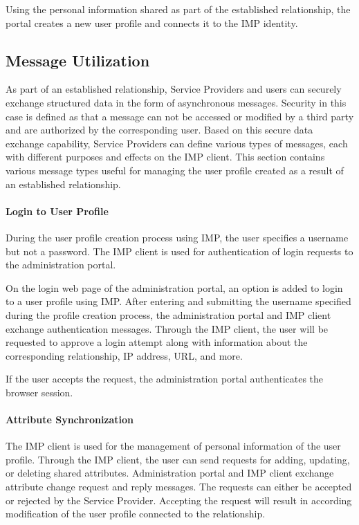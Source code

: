 Using the personal information shared as part of the established relationship, the portal creates a new user profile and connects it to the IMP identity.

\subsection{Message Utilization}
As part of an established relationship, Service Providers and users can securely exchange structured data in the form of asynchronous messages. Security in this case is defined as that a message can not be accessed or modified by a third party and are authorized by the corresponding user. Based on this secure data exchange capability, Service Providers can define various types of messages, each with different purposes and effects on the IMP client. This section contains various message types useful for managing the user profile created as a result of an established relationship.

\paragraph{Login to User Profile}
During the user profile creation process using IMP, the user specifies a username but not a password. The IMP client is used for authentication of login requests to the administration portal.

On the login web page of the administration portal, an option is added to login to a user profile using IMP. After entering and submitting the username specified during the profile creation process, the administration portal and IMP client exchange authentication messages. Through the IMP client, the user will be requested to approve a login attempt along with information about the corresponding relationship, IP address, URL, and more.

If the user accepts the request, the administration portal authenticates the browser session.

\paragraph{Attribute Synchronization}

The IMP client is used for the management of personal information of the user profile. Through the IMP client, the user can send requests for adding, updating, or deleting shared attributes. Administration portal and IMP client exchange attribute change request and reply messages. The requests can either be accepted or rejected by the Service Provider. Accepting the request will result in according modification of the user profile connected to the relationship.

